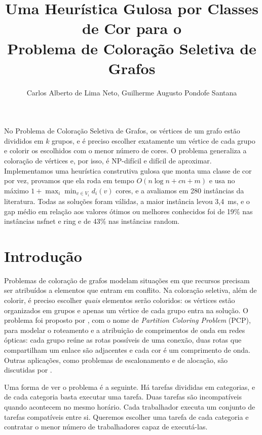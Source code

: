 \documentclass[12pt]{article}
\title{Uma Heurística Gulosa por Classes de Cor para o\\
  Problema de Coloração Seletiva de Grafos}
\author{Carlos Alberto de Lima Neto, Guilherme Augusto Pondofe Santana}
\begin{document}
\maketitle

\begin{resumo}
  No Problema de Coloração Seletiva de Grafos, os vértices de um grafo estão
  divididos em $k$ grupos, e é preciso escolher exatamente um vértice de cada
  grupo e colorir os escolhidos com o menor número de cores. O problema
  generaliza a coloração de vértices e, por isso, é NP-difícil e difícil de
  aproximar. Implementamos uma heurística construtiva gulosa que monta uma
  classe de cor por vez, provamos que ela roda em tempo
  $O(n\log n + cn + m)$ e usa no máximo $1+\max_i\min_{v\in V_i} d_i(v)$
  cores, e a avaliamos em 280 instâncias da literatura. Todas as soluções foram
  válidas, a maior instância levou 3,4~ms, e o gap médio em relação aos valores
  ótimos ou melhores conhecidos foi de 19\% nas instâncias nsfnet e ring e de
  43\% nas instâncias random.
\end{resumo}

\section{Introdução}

Problemas de coloração de grafos modelam situações em que recursos precisam
ser atribuídos a elementos que entram em conflito. Na coloração seletiva, além
de colorir, é preciso escolher \emph{quais} elementos serão coloridos: os
vértices estão organizados em grupos e apenas um vértice de cada grupo entra na
solução. O problema foi proposto por \cite{li2000}, com o nome de
\emph{Partition Coloring Problem} (PCP), para modelar o roteamento e a
atribuição de comprimentos de onda em redes ópticas: cada grupo reúne as rotas
possíveis de uma conexão, duas rotas que compartilham um enlace são adjacentes
e cada cor é um comprimento de onda. Outras aplicações, como problemas de 
escalonamento e de alocação, são discutidas por \cite{demange2015}.

Uma forma de ver o problema é a seguinte. Há tarefas divididas em categorias, e
de cada categoria basta executar uma tarefa. Duas tarefas são incompatíveis
quando acontecem no mesmo horário. Cada trabalhador executa um conjunto de
tarefas compatíveis entre si. Queremos escolher uma tarefa de cada categoria e
contratar o menor número de trabalhadores capaz de executá-las.
\end{document}
